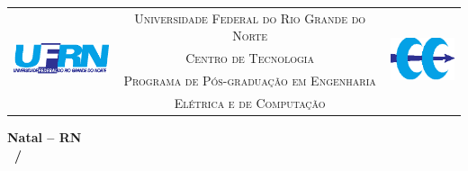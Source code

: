 \begin{titlepage}
\begin{center}

\begin{tabularx}{\linewidth}{@{}lcr@{}}
\multirow{4}{*}{\includegraphics[width=3cm]{imgs/outras/eps/ufrn_trad}}&
\textsc{Universidade Federal do Rio Grande do Norte} &
\multirow{4}{*}{\includegraphics[width=2cm]{imgs/outras/eps/ppgeec}}\\
& 
\textsc{Centro de Tecnologia}
&\\
& 
\textsc{Programa de Pós-graduação em Engenharia}
&\\
& 
\textsc{Elétrica e de Computação}
&
\end{tabularx}

\vfill

\LARGE
\textbf{\titulo}

\vfill

\Large
\textbf{\autor}

\vfill
\large
\textbf{Natal -- RN\\\Mesaprovacao\ /\ \Anoaprovacao}

\end{center}
\end{titlepage}

